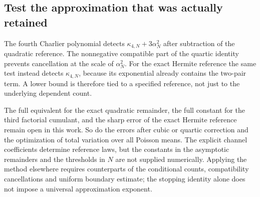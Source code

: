 \subsection{Test the approximation that was actually retained}

The fourth Charlier polynomial detects
\(\kappa_{4,N}+3\alpha_N^2\) after subtraction of the quadratic
reference. The nonnegative compatible part of the quartic identity
prevents cancellation at the scale of \(\alpha_N^2\).
For the exact Hermite reference the same test instead detects
\(\kappa_{4,N}\), because its exponential already contains the
two-pair term. A lower bound is therefore tied to a specified
reference, not just to the underlying dependent count.

The full equivalent for the exact quadratic remainder, the full
constant for the third factorial cumulant, and the sharp error of
the exact Hermite reference remain open in this work. So do the
errors after cubic or quartic correction and the optimization of
total variation over all Poisson means. The explicit channel
coefficients determine reference laws, but the constants in the
asymptotic remainders and the thresholds in \(N\) are not supplied
numerically. Applying the method elsewhere requires counterparts
of the conditional counts, compatibility cancellations and uniform
boundary estimate; the stopping identity alone does not impose a
universal approximation exponent.
